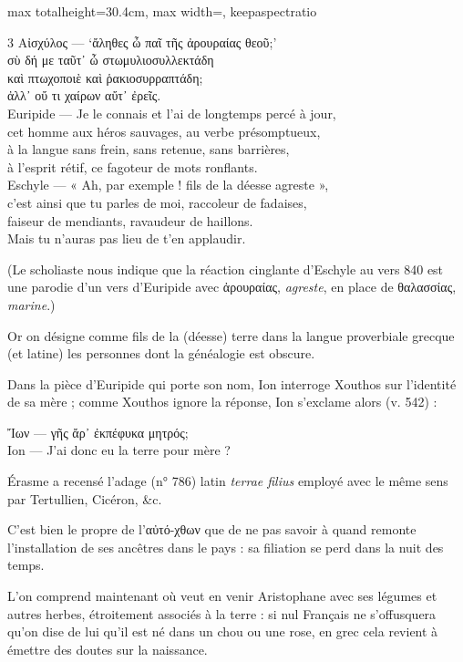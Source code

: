 \documentclass[11pt,twoside]{book}
\newcommand{\italique}[1]{\textit{#1}}
\newcommand{\citComm}[1]{\begin{quoting}[vskip=0.4pt,leftmargin=0.7em,rightmargin=0.2em]#1\end{quoting}}
\newcommand{\latin}[1]{\textit{#1}}
\begin{document}
\begin{adjustbox}{max totalheight=30.4cm, max width=\textwidth, keepaspectratio}
\begin{minipage}{\textwidth}
{\begin{multicols}{3}
{Αἰσχύλος --- `ἄληθες ὦ παῖ τῆς ἀρουραίας θεοῦ;'\\
σὺ δή με ταῦτ᾽ ὦ στωμυλιοσυλλεκτάδη\\
καὶ πτωχοποιὲ καὶ ῥακιοσυρραπτάδη;\\
ἀλλ᾽ οὔ τι χαίρων αὔτ᾽ ἐρεῖς.\\
Euripide --- Je le connais et l'ai de longtemps percé à jour,\\
cet homme aux héros sauvages, au verbe présomptueux,\\
à la langue sans frein, sans retenue, sans barrières,\\
à l'esprit rétif, ce fagoteur de mots ronflants.\\
Eschyle --- « Ah, par exemple ! fils de la déesse agreste », \\
c'est ainsi que tu parles de moi, raccoleur de fadaises,\\
faiseur de mendiants, ravaudeur de haillons.\\
Mais tu n'auras pas lieu de t'en applaudir.}
\par\vspace{1.5pt}
\noindent (Le scholiaste nous indique que la réaction cinglante d'Eschyle au vers 840 est une parodie d'un vers d'Euripide avec ἀρουραίας, \italique{agreste}, en place de θαλασσίας, \italique{marine}.)
\par\vspace{1.5pt}
\noindent Or on désigne comme fils de la (déesse) terre dans la langue proverbiale grecque (et latine) les personnes dont la généalogie est obscure.
\par\vspace{1.5pt}
\noindent Dans la pièce d'Euripide qui porte son nom, Ion interroge Xouthos sur l'identité de sa mère ; comme Xouthos ignore la réponse, Ion s'exclame alors (v. 542) :
\citComm{Ἴων --- γῆς ἄρ᾽ ἐκπέφυκα μητρός;\\
Ion --- J'ai donc eu la terre pour mère ?}
\par\vspace{1.5pt}
\noindent Érasme a recensé l'adage (n° 786) latin \latin{terrae filius} employé avec le même sens par Tertullien, Cicéron, \&c.
\par\vspace{1.5pt}
\noindent C'est bien le propre de l'αὐτό-χθων que de ne pas savoir à quand remonte l'installation de ses ancêtres dans le pays : sa filiation se perd dans la nuit des temps.
\par\vspace{1.5pt}
\noindent L'on comprend maintenant où veut en venir Aristophane avec ses légumes et autres herbes, étroitement associés à la terre : si nul Français ne s'offusquera qu'on dise de lui qu'il est né dans un chou ou une rose, en grec cela revient à émettre des doutes sur la naissance.

\end{multicols}}
\end{minipage}
\end{adjustbox}
\end{document}
